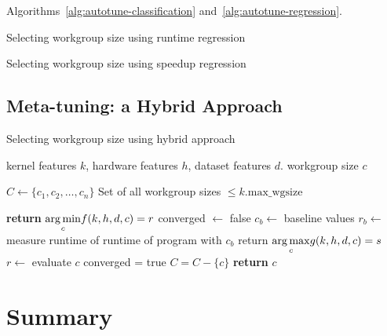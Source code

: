 

Algorithms~\ref{alg:autotune-classification} and~\ref{alg:autotune-regression}.

\begin{algorithm}

\caption{Selecting workgroup size using runtime regression}
\label{alg:autotune-runtime-regression}
\end{algorithm}

\begin{algorithm}

\caption{Selecting workgroup size using speedup regression}
\label{alg:autotune-speedup-regression}
\end{algorithm}


\subsection{Meta-tuning: a Hybrid Approach}

\begin{algorithm}
\caption{Selecting workgroup size using hybrid approach}
\label{alg:autotune-hybrid}
\begin{algorithmic}[1]
\Require kernel features $k$, hardware features $h$, dataset features $d$.
\Ensure workgroup size $c$

\State $C \leftarrow \{ c_1, c_2,\ldots, c_n \}$
\Comment Set of all workgroup sizes $\le k.\text{max\_wgsize}$

    \State \textbf{return} $\underset{c}{\operatorname*{arg\,min}} f(k,h,d,c) = r$
\Else
   \State converged $\leftarrow$ false
   \State $c_b \leftarrow$ baseline values
   \State $r_b \leftarrow$ measure runtime of runtime of program with $c_b$
     \State return $\underset{c}{\operatorname*{arg\,max}} g(k,h,d,c) = s$
     \State $r \leftarrow$ evaluate $c$
       \State converged = true
     \Else
       \State $C = C - \{c\}$
     \EndIf
   \EndWhile
   \State \textbf{return} $c$
\EndIf
\end{algorithmic}
\end{algorithm}

\section{Summary}
